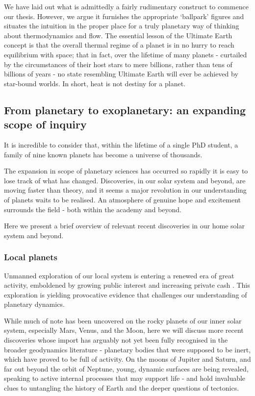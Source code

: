 \documentclass[a4paper,11pt,oneside]{book}
\begin{document}
We have laid out what is admittedly a fairly rudimentary construct to commence our thesis. However, we argue it furnishes the appropriate `ballpark' figures and situates the intuition in the proper place for a truly planetary way of thinking about thermodynamics and flow. The essential lesson of the Ultimate Earth concept is that the overall thermal regime of a planet is in no hurry to reach equilibrium with space; that in fact, over the lifetime of many planets - curtailed by the circumstances of their host stars to mere billions, rather than tens of billions of years - no state resembling Ultimate Earth will ever be achieved by star-bound worlds. In short, heat is not destiny for a planet.

\subsection{From planetary to exoplanetary: an expanding scope of inquiry}

It is incredible to consider that, within the lifetime of a single PhD student, a family of nine known planets has become a universe of thousands.

The expansion in scope of planetary sciences has occurred so rapidly it is easy to lose track of what has changed. Discoveries, in our solar system and beyond, are moving faster than theory, and it seems a major revolution in our understanding of planets waits to be realised. An atmosphere of genuine hope and excitement surrounds the field - both within the academy and beyond.

Here we present a brief overview of relevant recent discoveries in our home solar system and beyond.

\subsubsection{Local planets}

Unmanned exploration of our local system is entering a renewed era of great activity, emboldened by growing public interest and increasing private cash \cite{Baker2018-cq}. This exploration is yielding provocative evidence that challenges our understanding of planetary dynamics.

While much of note has been uncovered on the rocky planets of our inner solar system, especially Mars, Venus, and the Moon, here we will discuss more recent discoveries whose import has arguably not yet been fully recognised in the broader geodynamics literature - planetary bodies that were supposed to be inert, which have proved to be full of activity. On the moons of Jupiter and Saturn, and far out beyond the orbit of Neptune, young, dynamic surfaces are being revealed, speaking to active internal processes that may support life - and hold invaluable clues to untangling the history of Earth and the deeper questions of tectonics.
\end{document}
